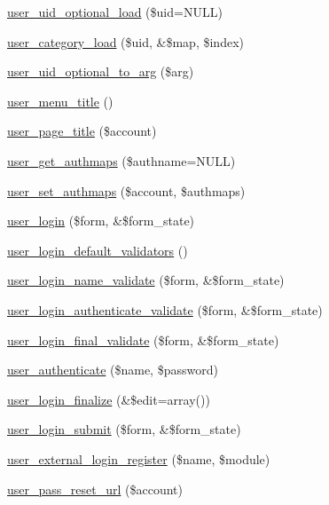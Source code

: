 \begin{DoxyCompactItemize}
\item 
\hyperlink{user_8module_adcdb22ab09fce9b389fb10ac76e13b07}{user\_\-uid\_\-optional\_\-load} (\$uid=NULL)
\item 
\hyperlink{user_8module_ad5ee67e73aa6eba6ce29186eea51e6d5}{user\_\-category\_\-load} (\$uid, \&\$map, \$index)
\item 
\hyperlink{user_8module_a802368ee732e9da8f756d69b0830225b}{user\_\-uid\_\-optional\_\-to\_\-arg} (\$arg)
\item 
\hyperlink{user_8module_ad14ec01a9c57ce03d8e8ab16c2e0a400}{user\_\-menu\_\-title} ()
\item 
\hyperlink{user_8module_ae37fe690b0461ac2b81b25fa3d51ecc8}{user\_\-page\_\-title} (\$account)
\item 
\hyperlink{user_8module_a71f0c8ed86c79dc3000478b2c62ec31c}{user\_\-get\_\-authmaps} (\$authname=NULL)
\item 
\hyperlink{user_8module_a343e11a6324c7b4036be888e61412ceb}{user\_\-set\_\-authmaps} (\$account, \$authmaps)
\item 
\hyperlink{group__forms_gac2d24ff71cebbfa81b8324ac1d9edfe2}{user\_\-login} (\$form, \&\$form\_\-state)
\item 
\hyperlink{user_8module_ad839942de106a39384979b02221f64fb}{user\_\-login\_\-default\_\-validators} ()
\item 
\hyperlink{user_8module_a8f96305420b1d860053ed6eaa50b8b34}{user\_\-login\_\-name\_\-validate} (\$form, \&\$form\_\-state)
\item 
\hyperlink{user_8module_a87098bdd1eef6b45820e23c53f8d8988}{user\_\-login\_\-authenticate\_\-validate} (\$form, \&\$form\_\-state)
\item 
\hyperlink{user_8module_aff194b554e3138ee149f97ed459d7d92}{user\_\-login\_\-final\_\-validate} (\$form, \&\$form\_\-state)
\item 
\hyperlink{user_8module_a741745e553ff115eb51b4dcc8af1ffbc}{user\_\-authenticate} (\$name, \$password)
\item 
\hyperlink{user_8module_af487aea9565f1a6c896c493c3df9c0b2}{user\_\-login\_\-finalize} (\&\$edit=array())
\item 
\hyperlink{user_8module_a84bba9d490507784160b5f3fc3d73f2f}{user\_\-login\_\-submit} (\$form, \&\$form\_\-state)
\item 
\hyperlink{user_8module_af4a2f1223554e9d79172c92273b81f2b}{user\_\-external\_\-login\_\-register} (\$name, \$module)
\item 
\hyperlink{user_8module_a99c0536278528e2b7d4fc0b9f7e2809d}{user\_\-pass\_\-reset\_\-url} (\$account)

\end{DoxyCompactItemize}
